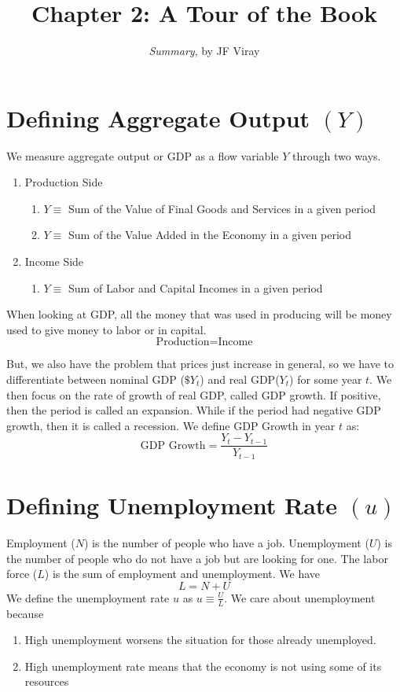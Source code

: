 \documentclass{extarticle}
\title{\vspace{-2em}Chapter 2: A Tour of the Book}
\author{\emph{Summary}, by JF Viray}
\date{}
\begin{document}
\maketitle



\section{Defining Aggregate Output $(Y)$}
We measure aggregate output or GDP as a flow variable $Y$ through two ways.
\begin{enumerate}
	\item Production Side
	\begin{enumerate}
		\item $Y \equiv$ Sum of the Value of Final Goods and Services in a given period
		\item $Y \equiv $ Sum of the Value Added in the Economy in a given period
	\end{enumerate}
	\item Income Side
	\begin{enumerate}
		\item $Y \equiv$ Sum of Labor and Capital Incomes in a given period
	\end{enumerate}
\end{enumerate} 

\noindent When looking at GDP, all the money that was used in producing will be money used to give money to labor or in capital.  
$$\text{Production} = \text{Income}$$

\noindent But, we also have the problem that prices just increase in general, so we have to differentiate between nominal GDP ($\$Y_t$) and real GDP($Y_t$) for some year $t$. We then focus on the rate of growth of real GDP, called GDP growth. If positive, then the period is called an expansion. While if the period had negative GDP growth, then it is called a recession. We define GDP Growth in year $t$ as:
$$\text{GDP Growth} = \frac{Y_t - Y_{t-1}}{Y_{t-1}}$$

\section{Defining Unemployment Rate $(u)$}
Employment ($N$) is the number of people who have a job. Unemployment ($U$) is the number of people who do not have a job but are looking for one. The labor force ($L$) is the sum of employment and unemployment. We have
$$L = N + U$$
We define the unemployment rate $u$ as $u \equiv \frac{U}{L}$. We care about unemployment because
\begin{enumerate}
	\item High unemployment worsens the situation for those already unemployed.
	\item High unemployment rate means that the economy is not using some of its resources
\end{enumerate}
\end{document}

